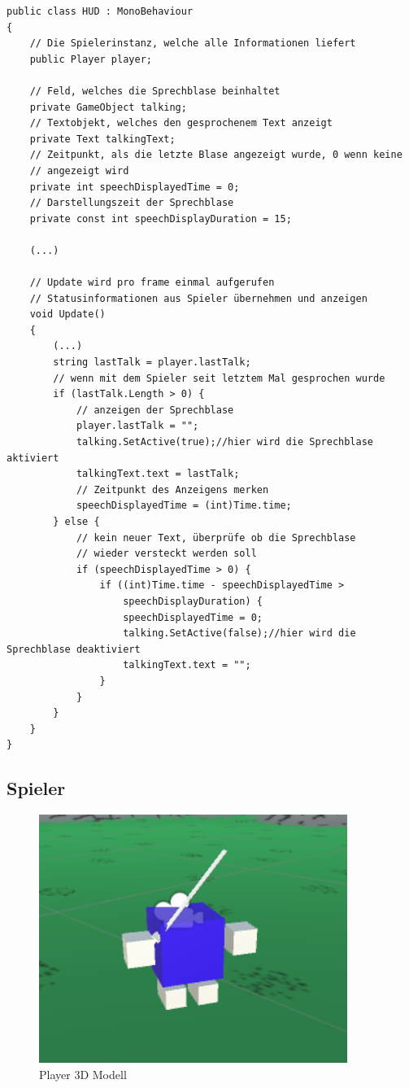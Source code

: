 \begin{lstlisting}[caption={Sprechblase ein- und ausblenden}]
public class HUD : MonoBehaviour
{
	// Die Spielerinstanz, welche alle Informationen liefert
	public Player player;

	// Feld, welches die Sprechblase beinhaltet
	private GameObject talking;
	// Textobjekt, welches den gesprochenem Text anzeigt
	private Text talkingText;
	// Zeitpunkt, als die letzte Blase angezeigt wurde, 0 wenn keine 
	// angezeigt wird
	private int speechDisplayedTime = 0;
	// Darstellungszeit der Sprechblase
	private const int speechDisplayDuration = 15;

	(...)
	
	// Update wird pro frame einmal aufgerufen
	// Statusinformationen aus Spieler übernehmen und anzeigen
	void Update()
	{
		(...)
		string lastTalk = player.lastTalk;
		// wenn mit dem Spieler seit letztem Mal gesprochen wurde
		if (lastTalk.Length > 0) {
			// anzeigen der Sprechblase
			player.lastTalk = "";
			talking.SetActive(true);//hier wird die Sprechblase aktiviert
			talkingText.text = lastTalk;
			// Zeitpunkt des Anzeigens merken
			speechDisplayedTime = (int)Time.time;
		} else {
			// kein neuer Text, überprüfe ob die Sprechblase 
			// wieder versteckt werden soll
			if (speechDisplayedTime > 0) {
				if ((int)Time.time - speechDisplayedTime > 
					speechDisplayDuration) {
					speechDisplayedTime = 0;
					talking.SetActive(false);//hier wird die Sprechblase deaktiviert
					talkingText.text = "";
				}
			}
		}	
	}
}
\end{lstlisting}

\subsection{Spieler}

\begin{figure}[H]
\includegraphics[scale=1]{screenshots/player.png}
\caption{Player 3D Modell}
\end{figure}


